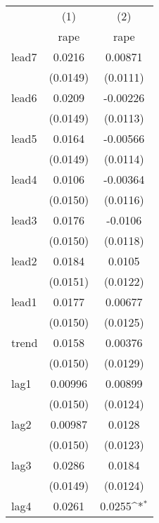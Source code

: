 {
\def\sym#1{\ifmmode^{#1}\else\(^{#1}\)\fi}
\begin{tabular}{l*{2}{c}}
\hline\hline
            &\multicolumn{1}{c}{(1)}&\multicolumn{1}{c}{(2)}\\
            &\multicolumn{1}{c}{rape}&\multicolumn{1}{c}{rape}\\
\hline
lead7       &      0.0216         &     0.00871         \\
            &    (0.0149)         &    (0.0111)         \\
[1em]
lead6       &      0.0209         &    -0.00226         \\
            &    (0.0149)         &    (0.0113)         \\
[1em]
lead5       &      0.0164         &    -0.00566         \\
            &    (0.0149)         &    (0.0114)         \\
[1em]
lead4       &      0.0106         &    -0.00364         \\
            &    (0.0150)         &    (0.0116)         \\
[1em]
lead3       &      0.0176         &     -0.0106         \\
            &    (0.0150)         &    (0.0118)         \\
[1em]
lead2       &      0.0184         &      0.0105         \\
            &    (0.0151)         &    (0.0122)         \\
[1em]
lead1       &      0.0177         &     0.00677         \\
            &    (0.0150)         &    (0.0125)         \\
[1em]
trend       &      0.0158         &     0.00376         \\
            &    (0.0150)         &    (0.0129)         \\
[1em]
lag1        &     0.00996         &     0.00899         \\
            &    (0.0150)         &    (0.0124)         \\
[1em]
lag2        &     0.00987         &      0.0128         \\
            &    (0.0150)         &    (0.0123)         \\
[1em]
lag3        &      0.0286         &      0.0184         \\
            &    (0.0149)         &    (0.0124)         \\
[1em]
lag4        &      0.0261         &      0.0255\sym{*}  \\

\end{tabular}}
